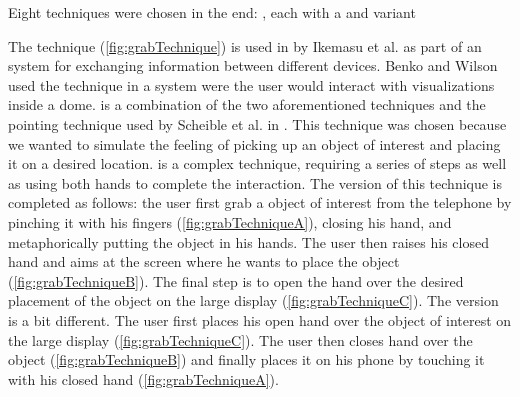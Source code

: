 Eight techniques were chosen in the end: \alltechniques, each with a \push and \pull variant

The \grab technique (\cref{fig:grabTechnique}) is used in  by Ikemasu et al. as part of an system for exchanging information between different devices. Benko and Wilson  used the \grab technique in a system were the user would interact with visualizations inside a dome. \grab is a combination of the two aforementioned techniques and the pointing technique used by Scheible et al. in .
This technique was chosen because we wanted to simulate the feeling of picking up an object of interest and placing it on a desired location.
\grab is a complex technique, requiring a series of steps as well as using both hands to complete the interaction.
The \push version of this technique is completed as follows: the user first grab a object of interest from the telephone by pinching it with his fingers (\cref{fig:grabTechniqueA}), closing his hand, and metaphorically putting the object in his hands.
The user then raises his closed hand and aims at the screen where he wants to place the object (\cref{fig:grabTechniqueB}).
The final step is to open the hand over the desired placement of the object on the large display (\cref{fig:grabTechniqueC}).
The \pull version is a bit different.
The user first places his open hand over the object of interest on the large display (\cref{fig:grabTechniqueC}).
The user then closes hand over the object (\cref{fig:grabTechniqueB}) and finally places it on his phone by touching it with his closed hand (\cref{fig:grabTechniqueA}).  



